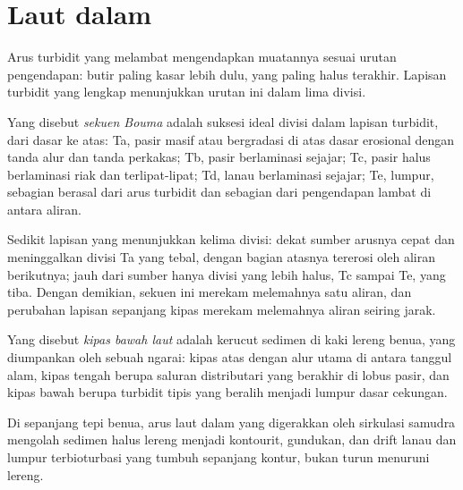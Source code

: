 \section{Laut dalam}\label{sec:b3:facies-models:deep}

Arus turbidit yang melambat mengendapkan muatannya sesuai urutan pengendapan:
butir paling kasar lebih dulu, yang paling halus terakhir. Lapisan turbidit yang lengkap menunjukkan
urutan ini dalam lima divisi.

\begin{definition}\label{def:b3:facies-models:bouma}
Yang disebut \emph{sekuen Bouma} adalah suksesi ideal
divisi dalam lapisan turbidit, dari dasar ke atas: Ta, pasir masif atau bergradasi di atas
dasar erosional dengan tanda alur dan tanda perkakas; Tb, pasir berlaminasi sejajar; Tc,
pasir halus berlaminasi riak dan terlipat-lipat; Td, lanau berlaminasi sejajar;
Te, lumpur, sebagian berasal dari arus turbidit dan sebagian dari pengendapan lambat
di antara aliran.
\end{definition}

Sedikit lapisan yang menunjukkan kelima divisi: dekat sumber arusnya cepat dan meninggalkan divisi Ta yang tebal,
dengan bagian atasnya tererosi oleh aliran berikutnya; jauh dari sumber hanya
divisi yang lebih halus, Tc sampai Te, yang tiba. Dengan demikian, sekuen ini merekam
melemahnya satu aliran, dan perubahan lapisan sepanjang kipas merekam melemahnya
aliran seiring jarak.

\begin{definition}\label{def:b3:facies-models:fan}
Yang disebut \emph{kipas bawah laut} adalah kerucut sedimen di kaki
lereng benua, yang diumpankan oleh sebuah ngarai: kipas atas dengan alur utama
di antara tanggul alam, kipas tengah berupa saluran distributari yang berakhir di lobus pasir,
dan kipas bawah berupa turbidit tipis yang beralih menjadi lumpur dasar cekungan.
\end{definition}

Di sepanjang tepi benua, arus laut dalam yang digerakkan oleh sirkulasi samudra mengolah
sedimen halus lereng menjadi kontourit, gundukan, dan drift
lanau dan lumpur terbioturbasi yang tumbuh sepanjang kontur, bukan turun
menuruni lereng.

